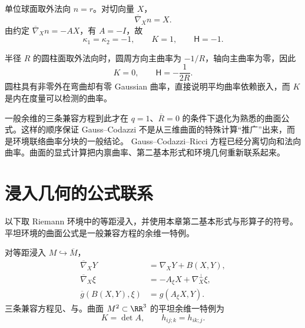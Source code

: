 \begin{exbox}[单位球面与圆柱面]
单位球面取外法向 $n=r$。对切向量 $X$，
\[
\overline\nabla_Xn=X.
\]
由约定 $\overline\nabla_Xn=-AX$，有 $A=-I$，故
\[
\kappa_1=\kappa_2=-1,
\qquad
K=1,
\qquad
\mathsf H=-1.
\]

半径 $R$ 的圆柱面取外法向时，圆周方向主曲率为 $-1/R$，轴向主曲率为零，因此
\[
K=0,
\qquad
\mathsf H=-\frac{1}{2R}.
\]
圆柱具有非零外在弯曲却有零 Gaussian 曲率，直接说明平均曲率依赖嵌入，而 $K$ 是内在度量可以检测的曲率。
\end{exbox}

一般余维的三条兼容方程到此才在 $q=1$、$\overline R=0$ 的条件下退化为熟悉的曲面公式。这样的顺序保证 Gauss--Codazzi 不是从三维曲面的特殊计算“推广”出来，而是环境联络曲率分块的一般结论。
Gauss--Codazzi--Ricci 方程已经分离切向和法向曲率。曲面的显式计算把内禀曲率、第二基本形式和环境几何重新联系起来。






\section{浸入几何的公式联系}
以下取 Riemann 环境中的等距浸入，并使用本章第二基本形式与形算子的符号。平坦环境的曲面公式是一般兼容方程的余维一特例。
\begin{note}[公式之间的联系]
对等距浸入 \(M\hookrightarrow\overline M\)，
\begin{align*}
\overline\nabla_XY&=\nabla_XY+B(X,Y),\\
\overline\nabla_X\xi&=-A_\xi X+\nabla_X^\perp\xi,\\
\overline g(B(X,Y),\xi)&=g(A_\xi X,Y).
\end{align*}
三条兼容方程见、与。曲面 \(M^2\subset\RR^3\) 的平坦余维一特例为
\[
K=\det A,
\qquad
h_{ij;k}=h_{ik;j}.
\]
\end{note}


